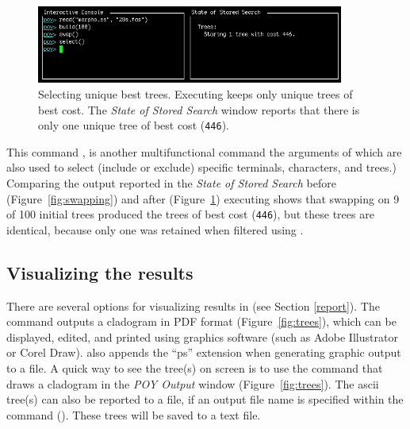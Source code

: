 {\begin{figure}[]
    \begin{center}
        \includegraphics[width=0.9\textwidth]{doc/figures/select.jpg}
    \end{center}
    \caption{Selecting unique best trees. Executing  keeps only unique trees of best cost. The 
    \emph{State of Stored Search} window reports that there is only one unique tree of best cost (\texttt{446}).}
    \label{fig:select}
\end{figure}

This command , is another multifunctional command the arguments of which are also used to 
select (include or exclude) specific terminals, characters, and trees.) Comparing the output reported in the 
\emph{State of Stored Search} before (Figure~\ref{fig:swapping}) and after (Figure~\ref{fig:select}) executing 
 shows that swapping on 9 of 100 initial trees produced the trees of best cost (\texttt{446}), 
but these trees are identical, because only one was retained when filtered using .

\subsection{Visualizing the results}

There are several options for visualizing results in \poy (see Section \ref{report}). The command
 outputs a cladogram in PDF format (Figure~\ref{fig:trees}), 
which can be displayed, edited, and printed using graphics software (such as Adobe Illustrator or Corel Draw). 
\poy also appends the ``ps'' extension when generating graphic output to a file. A quick way to see the tree(s) on screen 
is to use the command  that draws a cladogram in the \emph{POY Output} window 
(Figure~\ref{fig:trees}). The ascii tree(s) can also be reported to a file, if an output file name is specified within the 
command ().  These trees will be saved to a text file.

}
